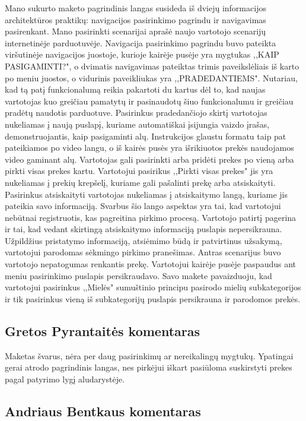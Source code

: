 \documentclass[oneside]{VUMIFPSkursinis}
\begin{document}
Mano sukurto maketo pagrindinis langas susideda iš dviejų informacijos architektūros praktikų: navigacijos pasirinkimo pagrindu ir navigavimas pasirenkant. 
Mano pasirinkti scenarijai aprašė naujo vartotojo scenarijų internetinėje parduotuvėje. 
Navigacija pasirinkimo pagrindu buvo pateikta viršutinėje navigacijos juostoje, kurioje kairėje pusėje yra mygtukas ,,KAIP PASIGAMINTI?", o dvimatis navigavimas pateiktas trimis paveikslėliais iš karto po meniu juostos, o vidurinis paveikliukas yra ,,PRADEDANTIEMS". 
Nutariau, kad tą patį funkcionalumą reikia pakartoti du kartus dėl to, kad naujas vartotojas kuo greičiau pamatytų ir pasinaudotų šiuo funkcionalumu ir greičiau pradėtų naudotis parduotuve. 
Pasirinkus pradedančiojo skirtį vartotojas nukeliamas į naują puslapį, kuriame automatiškai įsijungia vaizdo įrašas, demonstruojantis, kaip pasigaminti alų. 
Instrukcijos glaustu formatu taip pat pateikiamos po video langu, o iš kairės pusės yra išrikiuotos prekės naudojamos video gaminant alų.
Vartotojas gali pasirinkti arba pridėti prekes po vieną arba pirkti visas prekes kartu. 
Vartotojui pasirikus ,,Pirkti visas prekes" jis yra nukeliamas į prekių krepšelį, kuriame gali pašalinti prekę arba atsiskaityti. 
Pasirinkus atsiskaityti vartotojas nukeliamas į atsiskaitymo langą, kuriame jis pateikia savo informaciją. 
Svarbus šio lango aspektas yra tai, kad vartotojui nebūtnai registruotis, kas pagreitina pirkimo procesą. 
Vartotojo patirtį pagerina ir tai, kad vedant skirtingą atsiskaitymo informaciją puslapis nepersikrauna.
 Užpildžius pristatymo informaciją, atsiėmimo būdą ir patvirtinus užsakymą, vartotojui parodomas sėkmingo pirkimo pranešimas. \newline
Antras scenarijus buvo vartotojo nepatogumas renkantis prekę.
Vartotojui kairėje pusėje paspaudus ant meniu pasirinkimo puslapis persikraudavo.
Savo makete pavaizduoju, kad vartotojui pasirinkus ,,Mielės" sumuštinio principu pasirodo mielių subkategorijos ir tik pasirinkus vieną iš subkategorijų puslapis persikrauna ir parodomos prekės.
	\subsection{Gretos Pyrantaitės komentaras}
	Maketas švarus, nėra per daug pasirinkimų ar nereikalingų mygtukų. Ypatingai gerai atrodo pagrindinis langas, nes pirkėjui iškart pasiūloma suskirstyti prekes pagal patyrimo lygį aludarystėje.
	\subsection{Andriaus Bentkaus komentaras}
\end{document}
